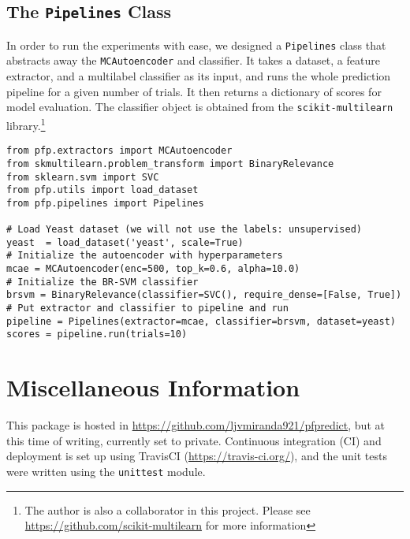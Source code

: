 \subsection{The \texttt{Pipelines} Class}

\par In order to run the experiments with ease, we designed a
\texttt{Pipelines} class that abstracts away the \texttt{MCAutoencoder} and
classifier. It takes a dataset, a feature extractor, and a multilabel
classifier as its input, and runs the whole prediction pipeline for a given
number of trials. It then returns a dictionary of scores for model evaluation.
The classifier object is obtained from the \texttt{scikit-multilearn}
library.\footnote{The author is also a collaborator in this project. Please see
\url{https://github.com/scikit-multilearn} for more information}

\begin{lstlisting}[style=mypython, caption=Minimal example for the prediction
pipeline]
from pfp.extractors import MCAutoencoder
from skmultilearn.problem_transform import BinaryRelevance
from sklearn.svm import SVC
from pfp.utils import load_dataset
from pfp.pipelines import Pipelines

# Load Yeast dataset (we will not use the labels: unsupervised)
yeast  = load_dataset('yeast', scale=True)
# Initialize the autoencoder with hyperparameters
mcae = MCAutoencoder(enc=500, top_k=0.6, alpha=10.0)
# Initialize the BR-SVM classifier
brsvm = BinaryRelevance(classifier=SVC(), require_dense=[False, True])
# Put extractor and classifier to pipeline and run
pipeline = Pipelines(extractor=mcae, classifier=brsvm, dataset=yeast)
scores = pipeline.run(trials=10)
\end{lstlisting}

\section{Miscellaneous Information}

\par This package is hosted in
\url{https://github.com/ljvmiranda921/pfpredict}, but at this time of writing,
currently set to private. Continuous integration (CI) and deployment is set up
using TravisCI (\url{https://travis-ci.org/}), and the unit tests were written
using the \texttt{unittest} module.

